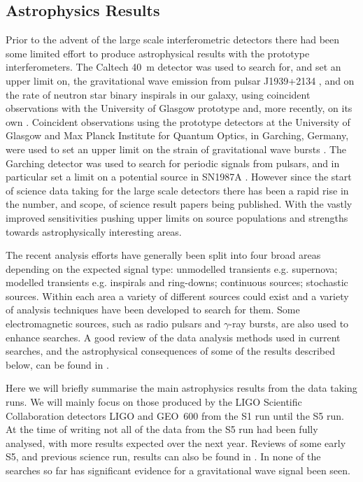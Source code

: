 \documentclass{article}
\begin{document}
\subsection{Astrophysics Results}\label{subsection:results}
Prior to the advent of the large scale interferometric detectors there had
been some limited effort to produce astrophysical results with the prototype
interferometers. The Caltech 40~m detector was used to search for, and set an
upper limit on, the gravitational wave emission from pulsar J1939+2134
\cite{Hereld:1984}, and on the rate of neutron star binary
inspirals in our galaxy, using coincident observations with the University of
Glasgow prototype \cite{Smith:1988} and, more recently, on its own
\cite{Allen:1999}. Coincident observations using the prototype detectors at the
University of Glasgow and Max Planck Institute for Quantum Optics, in Garching,
Germany, were used to set an upper limit on the strain of gravitational wave
bursts \cite{Nicholson:1996}. The Garching detector was used to search for
periodic signals from pulsars, and in particular set a limit on a potential
source in SN1987A \cite{Niebauer:1993}. However since the start of science data
taking for the large scale detectors there has been a rapid rise in the number,
and scope, of science result papers being published. With the vastly improved
sensitivities pushing upper limits on source populations and strengths towards
astrophysically interesting areas.

The recent analysis efforts have generally been split into four broad areas
depending on the expected signal type: unmodelled transients e.g. supernova;
modelled transients e.g. inspirals and ring-downs; continuous sources;
stochastic sources. Within each area a variety of different sources could
exist and a variety of analysis techniques have been developed to search for
them. Some electromagnetic sources, such as radio pulsars and $\gamma$-ray
bursts, are also used to enhance searches. A good review of the data analysis 
methods used in current searches, and the astrophysical consequences of some of
the results described below, can be found in \cite{Sathyaprakash:2009}.

Here we will briefly summarise the main astrophysics results from the data
taking runs. We will mainly focus on those produced by the LIGO Scientific
Collaboration \cite{LSCweb} detectors LIGO and GEO~600 from the S1 run until the
S5 run. At the time of writing not all of the data from the S5 run had been
fully analysed, with more results expected over the next year. Reviews of some
early S5, and previous science run, results can also be found in
\cite{Papa:2008, Fairhurst:2009}. In none of the searches so far has significant
evidence for a gravitational wave signal been seen.
\end{document}
